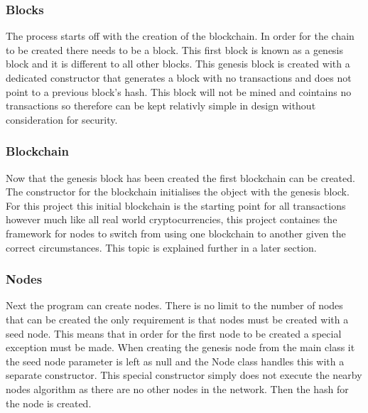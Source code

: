 \documentclass{l4proj}
\begin{document}
\subsubsection{Blocks}
The process starts off with the creation of the blockchain. In order for the chain to be created there needs to be
a block. This first block is known as a genesis block and it is different to all other blocks. This genesis block
is created with a dedicated constructor that generates a block with no transactions and does not point to a previous
block's hash. This block will not be mined and cointains no transactions so therefore can be kept relativly simple
in design without consideration for security. 

\subsubsection{Blockchain}
Now that the genesis block has been created the first blockchain can be created. The constructor for the blockchain
initialises the object with the genesis block. For this project this initial blockchain is the starting point for
all transactions however much like all real world cryptocurrencies, this project containes the framework for 
nodes to switch from using one blockchain to another given the correct circumstances. This topic is explained further
in a later section.

\subsubsection{Nodes}
Next the program can create nodes. There is no limit to the number of nodes that can be created the only 
requirement is that nodes must be created with a seed node. This means that in order for the first node to be created
a special exception must be made. When creating the genesis node from the main class it the seed node parameter
is left as null and the Node class handles this with a separate constructor. This special constructor simply
does not execute the nearby nodes algorithm as there are no other nodes in the network. Then the hash for the 
node is created. 
\end{document}
